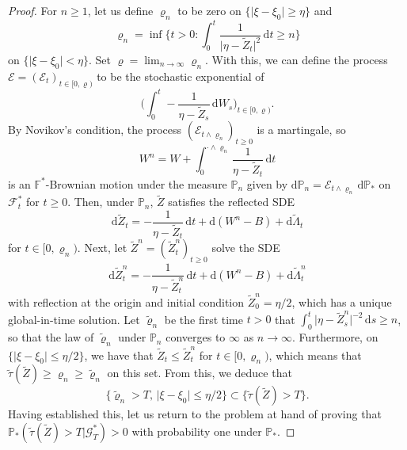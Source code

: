 \documentclass[11pt, a4paper]{article}
\theoremstyle{plain}
\theoremstyle{definition}
\theoremstyle{remark}
\numberwithin{equation}{section}
\newcommand{\pr}{\mathbb{P}}
\newcommand{\F}{\mathcal{F}}
\renewcommand{\d}{\mathrm{d}}
\newcommand{\define}{\mathpunct{:}}
\newcommand{\bb}[1]{\mathbb{#1}}
\renewcommand{\cal}[1]{\mathcal{#1}}
\begin{document}
\begin{proof}
For $n \geq 1$, let us define $\varrho_n$ to be zero on $\{\lvert \xi - \xi_0\rvert \geq \eta\}$ and
\begin{equation*}
    \varrho_n = \inf\biggl\{t > 0 \define \int_0^t \frac{1}{\lvert \eta - \tilde{Z}_t\rvert^2} \, \d t \geq n\biggr\}
\end{equation*}
on $\{\lvert \xi - \xi_0\rvert < \eta\}$. Set $\varrho = \lim_{n \to \infty} \varrho_n$. With this, we can define the process $\cal{E} = (\cal{E}_t)_{t \in [0, \varrho)}$ to be the stochastic exponential of
\begin{equation*}
    \biggl(\int_0^t -\frac{1}{\eta - \tilde{Z}_s} \, \d W_s\biggr)_{t \in [0, \varrho)}.
\end{equation*}
By Novikov's condition, the process $(\cal{E}_{t \land \varrho_n})_{t \geq 0}$ is a martingale, so
\begin{equation*}
    W^n = W + \int_0^{\cdot \land \varrho_n} \frac{1}{\eta - \tilde{Z}_t} \, \d t
\end{equation*}
is an $\bb{F}^{\ast}$-Brownian motion under the measure $\pr_n$ given by $\d \pr_n = \cal{E}_{t \land \varrho_n}\, \d \pr_{\ast}$ on $\F^{\ast}_t$ for $t \geq 0$. 
Then, under $\pr_n$, $\tilde{Z}$ satisfies the reflected SDE
\begin{equation*}
    \d \tilde{Z}_t = - \frac{1}{\eta - \tilde{Z}_t} \, \d t + \d (W^n - B) + \d \tilde{\Lambda}_t
\end{equation*}
for $t \in [0, \varrho_n)$. Next, let $\tilde{Z}^n = (\tilde{Z}^n_t)_{t \geq 0}$ solve the SDE
\begin{equation*}
    \d \tilde{Z}^n_t = - \frac{1}{\eta - \tilde{Z}^n_t} \, \d t + \d (W^n - B) + \d \tilde{\Lambda}^n_t
\end{equation*}
with reflection at the origin and initial condition $\tilde{Z}^n_0 = \eta/2$, which has a unique global-in-time solution. Let $\tilde{\varrho}_n$ be the first time $t > 0$ that $\int_0^t \lvert \eta - \tilde{Z}^n_s\rvert^{-2} \, \d s \geq n$, so that the law of $\tilde{\varrho}_n$ under $\pr_n$ converges to $\infty$ as $n \to \infty$. Furthermore, on $\{\lvert \xi - \xi_0\rvert \leq \eta/2\}$, we have that $\tilde{Z}_t \leq \tilde{Z}^n_t$ for $t \in [0, \varrho_n)$, which means that $\tilde{\tau}(\tilde{Z}) \geq \varrho_n \geq \tilde{\varrho}_n$ on this set. From this, we deduce that
\begin{equation} \label{eq:simplified_probab}
    \bigl\{\tilde{\varrho}_n > T,\, \lvert \xi - \xi_0\rvert \leq \eta/2\bigr\} \subset \{\tilde{\tau}(\tilde{Z}) > T\}.
\end{equation}
Having established this, let us return to the problem at hand of proving that $\pr_{\ast}(\tilde{\tau}(\tilde{Z}) > T \vert \cal{G}^{\ast}_T) > 0$ with probability one under $\pr_{\ast}$.


\end{proof}
\end{document}

